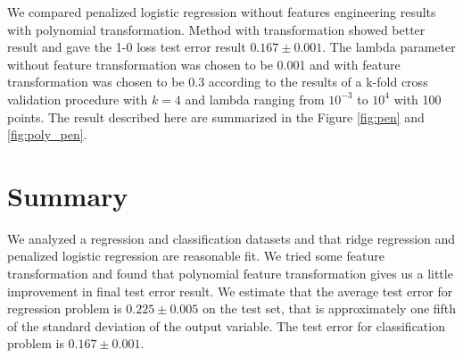 \documentclass{article} %
\begin{document}
We compared penalized logistic regression without features engineering results
with polynomial transformation. Method with transformation showed better result
and gave the 1-0 loss test error result  $0.167\pm0.001$. The lambda parameter
without feature transformation was chosen to be 0.001 and with feature
transformation was chosen to be 0.3 according to the results of a k-fold cross
validation procedure with $k=4$ and lambda ranging from $10^{-3}$ to $10^4$  with 100 points. The result described here are summarized in the Figure \ref{fig:pen} and \ref{fig:poly_pen}.

\begin{figure}[!t]
\center
{}
\hfill
\caption{}
\end{figure}

\section{Summary}
We analyzed a regression and classification datasets and that ridge regression and penalized logistic regression are reasonable fit.
We tried some feature transformation and found that polynomial feature transformation gives us a little improvement in final test error result. 
We estimate that the average test error for regression problem is $0.225\pm0.005$
on the test set, that is approximately one fifth of the standard deviation of the output variable. The test error for classification problem is $0.167\pm0.001$.
\end{document}
